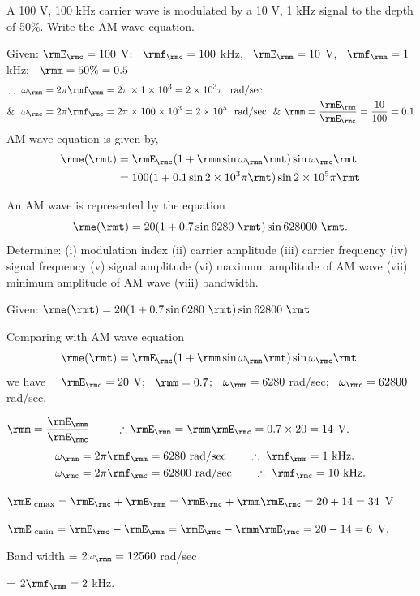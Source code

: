 \begin{problem}\label{prob8.11}
A 100 V, 100 kHz carrier wave is modulated by a 10 V, 1 kHz signal to
the depth of 50\%. Write the AM wave equation.
\end{problem}

\begin{solution}
Given: $\rmE_\rmc = 100$ V; ~$\rmf_\rmc = 100$ kHz, ~$\rmE_\rmm = 10$ V, ~$\rmf_\rmm = 1$ kHz;
~$\rmm=50\% = 0.5$
\begin{align*}
\therefore ~ \omega_\rmm & = 2 \pi \rmf_\rmm = 2 \pi \times 1 \times 10^3 =
2 \times 10^3 \pi \text{ ~rad/sec }\\
\&~~ \omega_\rmc & = 2 \pi \rmf_\rmc = 2 \pi \times 100 \times 10^3 = 2 \times
10^5 \text{ ~rad/sec~ } \& ~\rmm = \frac{\rmE_\rmm}{\rmE_\rmc} = \frac{10}{100} = 0.1
\end{align*}
AM wave equation is given by,
\begin{align*}
\rme(\rmt) & = \rmE_\rmc  (1+\rmm \sin \omega_\rmm \rmt) \sin \omega_\rmc \rmt\\
& = 100 (1 + 0.1 \sin 2 \times 10^3 \pi \rmt) \sin 2 \times 10^5 \pi \rmt
\end{align*}
\end{solution}

\begin{problem}\label{prob8.12}
An AM wave is represented by the equation 
$$ 
\rme(\rmt) = 20 (1+0.7 \sin 6280 ~\rmt) \sin 628000 ~\rmt.
$$
Determine: (i) modulation index (ii) carrier amplitude (iii) carrier
frequency (iv) signal frequency (v) signal amplitude  (vi) maximum
amplitude of AM wave (vii) minimum amplitude of AM wave (viii) bandwidth.
\end{problem}

\begin{solution}
Given: $\rme(\rmt) = 20 (1+0.7 \sin 6280~\rmt) \sin 62800 ~\rmt$

Comparing with AM wave equation
$$
\rme(\rmt) = \rmE_\rmc (1+\rmm \sin \omega_\rmm \rmt) \sin \omega_\rmc \rmt.
$$
we have ~~$\rmE_\rmc = 20$ V; ~$\rmm=0.7$; ~$\omega_\rmm=6280$ rad/sec;~
 $\omega_\rmc = 62800$ rad/sec.

\smallskip
 $\rmm = \dfrac{\rmE_\rmm}{\rmE_\rmc}\qquad ~\therefore  \rmE_\rmm = \rmm \rmE_\rmc =
0.7 \times 20= 14$ V.
\begin{align*}
\omega_\rmm & = 2 \pi \rmf_\rmm = 6280 \text{ rad/sec} \qquad \therefore ~\rmf_\rmm = 1
\text{ kHz}.\\
\omega_\rmc & = 2 \pi \rmf_\rmc = 62800 \text{
rad/sec} \qquad \therefore ~\rmf_\rmc = 10 \text{ kHz}.
\end{align*}

$\rmE_{\text{ cmax}} = \rmE_\rmc + \rmE_\rmm = \rmE_\rmc + \rmm \rmE_\rmc = 20 + 14 = 34 $ V 

\smallskip
$\rmE_{\text{ cmin}} = \rmE_\rmc - \rmE_\rmm = \rmE_\rmc - \rmm \rmE_\rmc = 20 - 14 = 6$ V.

\smallskip
Band width = $2 \omega_\rmm = 12560$ rad/sec

\hspace{1.8cm} = $2 \rmf_\rmm = 2$ kHz.
\end{solution}

